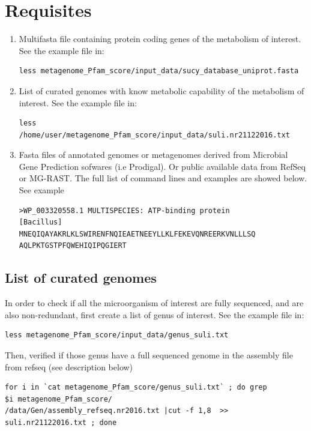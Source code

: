 \documentclass[12pt]{report}
\begin{document}
\section{Requisites}
\begin{enumerate}

\item Multifasta file containing protein coding genes of the metabolism of
interest. See the example file in: 
\begin{verbatim}
less metagenome_Pfam_score/input_data/sucy_database_uniprot.fasta
\end{verbatim}

\item List of curated genomes with know metabolic capability of the metabolism
of interest.  See the example file in: 
\begin{verbatim}
less /home/user/metagenome_Pfam_score/input_data/suli.nr21122016.txt
\end{verbatim}

\item Fasta files of annotated genomes or metagenomes derived from Microbial
Gene Prediction sofwares (i.e Prodigal). Or public available data from RefSeq
or MG-RAST. The full list of command lines and examples are showed below. See
example
\begin{verbatim}
>WP_003320558.1 MULTISPECIES: ATP-binding protein 
[Bacillus]
MNEQIQAYAKRLKLSWIRENFNQIEAETNEEYLLKLFEKEVQNREERKVNLLLSQ
AQLPKTGSTPFQWEHIQIPQGIERT
\end{verbatim}
\end{enumerate}
\subsection{List of curated genomes}

In order to check if all the  microorganism of interest are fully sequenced,
and are also non-redundant, first create a list of genus of interest. See the
example file in: 
\begin{verbatim}
less metagenome_Pfam_score/input_data/genus_suli.txt
\end{verbatim}

Then, verified if those genus have a full  sequenced genome in the 
assembly file from refseq (see description below)
\begin{verbatim}
for i in `cat metagenome_Pfam_score/genus_suli.txt` ; do grep 
$i metagenome_Pfam_score/
/data/Gen/assembly_refseq.nr2016.txt |cut -f 1,8  >> suli.nr21122016.txt ; done
\end{verbatim}
\end{document}
